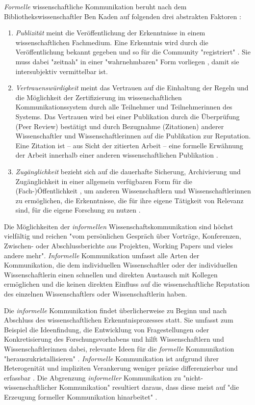 \textit{Formelle} wissenschaftliche Kommunikation beruht nach dem Bibliothekswissenschaftler Ben Kaden auf folgenden drei abstrakten Faktoren \cite{Kaden_2009}:
\begin{enumerate}
\item \textit{Publizität} meint die Veröffentlichung der Erkenntnisse in einem wissenschaftlichen Fachmedium. Eine Erkenntnis wird durch die Veröffentlichung bekannt gegeben und so für die Community "registriert" \cite{Kaden_2009} \cite[:5]{Seidenfaden_2005}. Sie muss dabei "zeitnah" in einer "wahrnehmbaren" Form vorliegen \cite{Schimank_2012}, damit sie intersubjektiv vermittelbar ist.
\item \textit{Vertrauenswürdigkeit} meint das Vertrauen auf die Einhaltung der Regeln und die Möglichkeit der Zertifizierung \cite[:6]{Seidenfaden_2005} im wissenschaftlichen Kommunikationssystem durch alle Teilnehmer und Teilnehmerinnen des Systems. Das Vertrauen wird bei einer Publikation durch die Überprüfung (Peer Review) bestätigt und durch Bezugnahme (Zitationen) anderer Wissenschaftler und Wissenschaftlerinnen auf die Publikation zur Reputation. Eine Zitation ist – aus Sicht der zitierten Arbeit – eine formelle Erwähnung der Arbeit innerhalb einer anderen wissenschaftlichen Publikation \cite{Weller_2011}.
\item \textit{Zugänglichkeit} bezieht sich auf die dauerhafte Sicherung, Archivierung \cite[:6]{Seidenfaden_2005} und Zugänglichkeit in einer allgemein verfügbaren Form für die (Fach-)Öffentlichkeit \cite{Naeder_2010}, um anderen Wissenschaftlern und Wissenschaftlerinnen zu ermöglichen, die Erkenntnisse, die für ihre eigene Tätigkeit von Relevanz sind, für die eigene Forschung zu nutzen \cite[:6]{Seidenfaden_2005}.
\end{enumerate}

Die Möglichkeiten der \textit{informellen} Wissenschaftskommunikation sind höchst vielfältig und reichen "vom persönlichen Gespräch über Vorträge, Konferenzen, Zwischen- oder Abschlussberichte aus Projekten, Working Papers und vieles andere mehr"\cite{Hanekop_2014}. \textit{Informelle} Kommunikation umfasst alle Arten der Kommunikation, die dem individuellen Wissenschaftler oder der individuellen Wissenschaftlerin einen schnellen und direkten Austausch mit Kollegen ermöglichen und die keinen direkten Einfluss auf die wissenschaftliche Reputation des einzelnen Wissenschaftlers oder Wissenschaftlerin haben.

Die \textit{informelle} Kommunikation findet überlicherweise zu Beginn und nach Abschluss des wissenschaftlichen Erkenntnisprozesses statt. Sie umfasst zum Beispiel die Ideenfindung, die Entwicklung von Fragestellungen oder Konkretisierung des Forschungsvorhabens und hilft Wissenschaftlern und Wissenschaftlerinnen dabei, relevante Ideen für die \textit{formelle} Kommunikation "herauszukristallisieren" \cite{Hanekop_2014}. \textit{Informelle} Kommunikation ist aufgrund ihrer Heterogenität und impliziten Verankerung weniger präzise differenzierbar und erfassbar \cite{Kaden_2009}. Die Abgrenzung \textit{informeller} Kommunikation zu "nicht-wissenschaftlicher Kommunikation" resultiert daraus, dass diese meist auf "die Erzeugung formeller Kommunikation hinarbeitet" \cite{Kaden_2009}.

